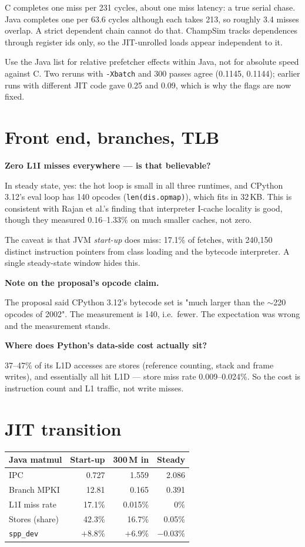 \documentclass[11pt,a4paper]{article}
\newcommand{\Q}[1]{\begin{question}\textbf{#1}\end{question}}
\begin{document}
C completes one miss per 231 cycles, about one miss latency: a true serial chase. Java
completes one per 63.6 cycles although each takes 213, so roughly 3.4 misses overlap. A
strict dependent chain cannot do that. ChampSim tracks dependences through register ids
only, so the JIT-unrolled loads appear independent to it.

Use the Java list for relative prefetcher effects within Java, not for absolute speed
against C. Two reruns with \texttt{-Xbatch} and 300 passes agree (0.1145, 0.1144); earlier
runs with different JIT code gave 0.25 and 0.09, which is why the flags are now fixed.

\section{Front end, branches, TLB}

\Q{Zero L1I misses everywhere --- is that believable?}

In steady state, yes: the hot loop is small in all three runtimes, and CPython 3.12's eval
loop has 140 opcodes (\texttt{len(dis.opmap)}), which fits in 32\,KB. This is consistent with
Rajan et al.'s finding that interpreter I-cache locality is good, though they measured
0.16--1.33\% on much smaller caches, not zero.

The caveat is that JVM \emph{start-up} does miss: 17.1\% of fetches, with 240{,}150 distinct
instruction pointers from class loading and the bytecode interpreter. A single steady-state
window hides this.

\Q{Note on the proposal's opcode claim.}

The proposal said CPython 3.12's bytecode set is "much larger than the $\sim$220 opcodes of
2002". The measurement is 140, i.e.\ fewer. The expectation was wrong and the measurement
stands.

\Q{Where does Python's data-side cost actually sit?}

37--47\% of its L1D accesses are stores (reference counting, stack and frame writes), and
essentially all hit L1D --- store miss rate 0.009--0.024\%. So the cost is instruction count
and L1 traffic, not write misses.

\section{JIT transition}

\begin{center}
\begin{tabular}{lrrr}
\toprule
\textbf{Java matmul} & \textbf{Start-up} & \textbf{300\,M in} & \textbf{Steady} \\
\midrule
IPC                  & 0.727  & 1.559   & 2.086 \\
Branch MPKI          & 12.81  & 0.165   & 0.391 \\
L1I miss rate        & 17.1\% & 0.015\% & 0\% \\
Stores (share)       & 42.3\% & 16.7\%  & 0.05\% \\
\texttt{spp\_dev}    & $+8.8\%$ & $+6.9\%$ & $-0.03\%$ \\
\bottomrule
\end{tabular}
\end{center}
\end{document}
